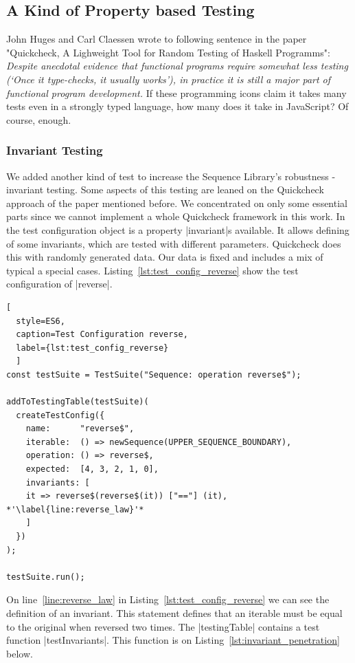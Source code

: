 \subsection{A Kind of Property based Testing}
\label{sub:A Kind of Property based Testing}
John Huges and Carl Claessen wrote to following sentence in the paper
"Quickcheck, A Lighweight Tool for Random Testing of Haskell Programms":
\textit{
Despite anecdotal evidence that functional programs require somewhat less
testing (`Once it type-checks, it usually works'), in practice it is still a 
major part of functional program development.}
If these programming icons claim it takes many tests even in a strongly typed 
language, how many does it take in JavaScript? Of course, enough.

\subsubsection{Invariant Testing}
\label{subsub:Invariant Testing}
We added another kind of test to increase the Sequence Library's robustness -
invariant testing. Some aspects of this testing are leaned on the Quickcheck
approach of the paper mentioned before. We concentrated on only some essential
parts since we cannot implement a whole Quickcheck framework in this work.
\newline
In the test configuration object
is a property |invariant|s available. It allows defining of some invariants, which are
tested with different parameters. Quickcheck does this with randomly generated
data. Our data is fixed and includes a mix of typical a special cases.
\newline
Listing~\ref{lst:test_config_reverse} show the test configuration of |reverse|.

\begin{lstlisting}[
  style=ES6, 
  caption=Test Configuration reverse,
  label={lst:test_config_reverse}
  ]
const testSuite = TestSuite("Sequence: operation reverse$");

addToTestingTable(testSuite)(
  createTestConfig({
    name:      "reverse$",
    iterable:  () => newSequence(UPPER_SEQUENCE_BOUNDARY),
    operation: () => reverse$,
    expected:  [4, 3, 2, 1, 0],
    invariants: [
    it => reverse$(reverse$(it)) ["=="] (it), *'\label{line:reverse_law}'*
    ]
  })
);

testSuite.run();
\end{lstlisting}
On line~\ref{line:reverse_law} in Listing~\ref{lst:test_config_reverse} we can 
see the definition of an invariant. This statement defines that an iterable must be 
equal to the original when reversed two times.
\newline
The |testingTable| contains a test function |testInvariants|. This function is on
Listing~\ref{lst:invariant_penetration} below.

